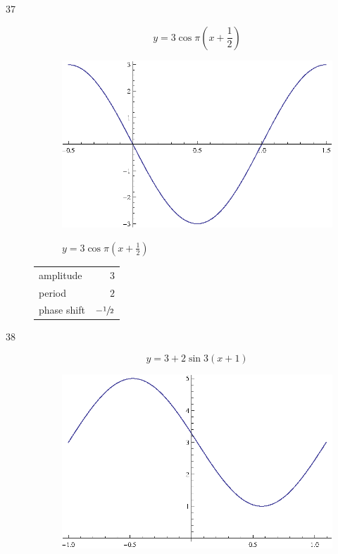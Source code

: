 \documentclass{exam}
\begin{document}
\begin{description}
      \item[37]
        \[
          y = 3 \cos \pi \left( x + \frac{1}{2} \right) 
        \]

        \begin{figure}[H]
          \centering
          \includegraphics[scale=1.0]{exercise37.eps}

          $y = 3 \cos \pi \left( x + \frac{1}{2} \right)$
        \end{figure}

        \begin{tabular}[H]{lr}
          \toprule
          amplitude   & $3$ \\
          period      & $2$ \\
          phase shift & $- \sfrac{1}{2}$ \\
          \bottomrule
        \end{tabular}

      \pagebreak

      \item[38]
        \[
          y = 3 + 2 \sin 3 \left( x + 1 \right) 
        \]

        \begin{figure}[H]
          \centering
          \includegraphics[scale=1.0]{exercise38.eps}


\end{figure}
\end{description}
\end{document}
